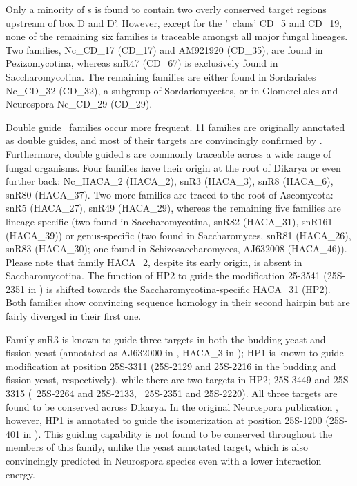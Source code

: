 Only a minority of \cd s is found to contain two overly conserved
target regions upstream of box D and D'. However, except for the '\sno\
clans' CD\_5 and CD\_19, none of the remaining six families is
traceable amongst all major fungal lineages. Two families, Nc\_CD\_17
(CD\_17) and AM921920 (CD\_35), are found in Pezizomycotina, whereas
snR47 (CD\_67) is exclusively found in Saccharomycotina. The remaining
families are either found in Sordariales Nc\_CD\_32 (CD\_32), a
subgroup of Sordariomycetes, or in Glomerellales and Neurospora
Nc\_CD\_29 (CD\_29).

Double guide \haca\ families occur more frequent. 11 families are
originally annotated as double guides, and most of their targets are
convincingly confirmed by \snostrip. Furthermore, double guided \haca
s are commonly traceable across a wide range of fungal organisms. Four
families have their origin at the root of Dikarya or even further
back: Nc\_HACA\_2 (HACA\_2), snR3 (HACA\_3), snR8 (HACA\_6), snR80
(HACA\_37). Two more families are traced to the root of Ascomycota:
snR5 (HACA\_27), snR49 (HACA\_29), whereas the remaining five families
are lineage-specific (two found in Saccharomycotina, snR82 (HACA\_31),
snR161 (HACA\_39)) or genus-specific (two found in Saccharomyces,
snR81 (HACA\_26), snR83 (HACA\_30); one found in Schizosaccharomyces,
AJ632008 (HACA\_46)). Please note that family HACA\_2, despite its
early origin, is absent in Saccharomycotina. The function of HP2 to
guide the modification 25-3541 (25S-2351 in \sce) is shifted towards
the Saccharomycotina-specific HACA\_31 (HP2). Both families show
convincing sequence homology in their second hairpin but are fairly
diverged in their first one.

Family snR3 is known \cite{Schattner:2004} to guide three targets in
both the budding yeast and fission yeast (annotated as AJ632000 in
\spo, HACA\_3 in \snostrip); HP1 is known to guide modification at
position 25S-3311 (25S-2129 and 25S-2216 in the budding and fission
yeast, respectively), while there are two targets in HP2; 25S-3449 and
25S-3315 (\sce\ 25S-2264 and 25S-2133, \spo\ 25S-2351 and
25S-2220). All three targets are found to be conserved across
Dikarya. In the original Neurospora publication \cite{Liu:2009},
however, HP1 is annotated to guide the isomerization at position
25S-1200 (25S-401 in \Ncr). This guiding capability is not found to be
conserved throughout the members of this family, unlike the yeast
annotated target, which is also convincingly predicted in Neurospora
species even with a lower interaction energy.

